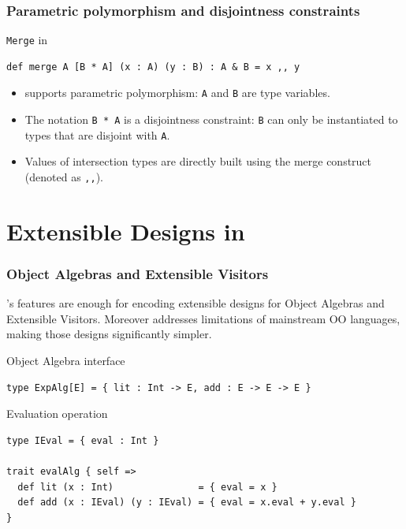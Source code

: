 \documentclass{beamer}
\begin{document}
\begin{frame}[fragile]
  \frametitle{Parametric polymorphism and disjointness constraints}

  \begin{exampleblock}{\lstinline{Merge} in \name}
\begin{lstlisting}
def merge A [B * A] (x : A) (y : B) : A & B = x ,, y
\end{lstlisting}

  \end{exampleblock}


  \begin{block}{}
    \begin{itemize}
    \item \name supports parametric polymorphism: \lstinline{A} and
      \lstinline{B} are type variables.
    \item The notation \lstinline{B * A} is a disjointness constraint:
      \lstinline{B} can only be instantiated to types that are disjoint with
      \lstinline{A}.
      \item Values of intersection types are directly built using the merge
        construct (denoted as \lstinline{,,}).
    \end{itemize}
  \end{block}

\end{frame}


\section{Extensible Designs in \name}

\begin{frame}[fragile]
  \frametitle{Object Algebras and Extensible Visitors}

\name's features are enough for encoding extensible designs for Object Algebras
and Extensible Visitors. Moreover \name addresses limitations of mainstream OO
languages, making those designs significantly simpler.

\pause

\begin{exampleblock}{Object Algebra interface}
\begin{lstlisting}
type ExpAlg[E] = { lit : Int -> E, add : E -> E -> E }
\end{lstlisting}
\end{exampleblock}

\pause

\begin{exampleblock}{Evaluation operation}
\begin{lstlisting}
type IEval = { eval : Int }

trait evalAlg { self =>
  def lit (x : Int)               = { eval = x }
  def add (x : IEval) (y : IEval) = { eval = x.eval + y.eval }
}
\end{lstlisting}
\end{exampleblock}

\end{frame}
\end{document}

